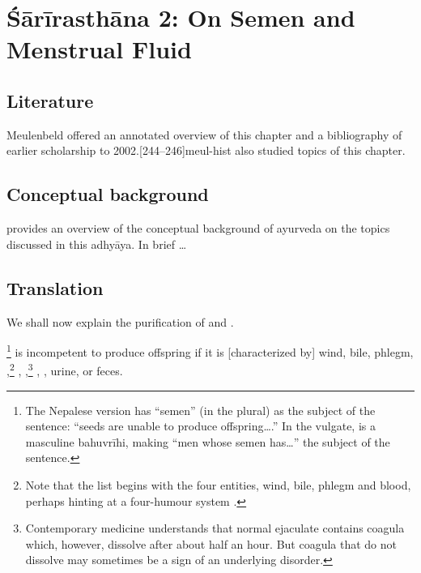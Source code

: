 
\chapter{Śārīrasthāna 2:  On Semen and Menstrual Fluid}


\section{Literature} 

Meulenbeld offered an annotated overview of this chapter and a bibliography
of earlier scholarship to 2002.[244--246]{meul-hist}  \citet[chs 
6--8]{das-2003} also studied topics of this chapter. 

\section{Conceptual background}


\citet[ch.\,13]{das-2003} provides an overview of the conceptual background of 
ayurveda on the topics discussed in this adhyāya.  In brief \ldots 

\section{Translation}

\begin{translation}
    
    \item [1] We shall now explain the purification of  and 
    .
    
    
    \item [3]  \footnote{The Nepalese version has
     “semen” (in the plural) as the subject of the sentence: “seeds 
    are
    unable to produce offspring\ldots.”  In the vulgate, 
    is a masculine bahuvrīhi, making “men whose semen has\ldots” the
    subject of the sentence.} is incompetent to produce offspring if it
    is [characterized by] wind, bile, phlegm,
    ,\footnote{Note that the list begins with the
        four entities, wind, bile, phlegm and blood, perhaps hinting at a
        four-humour system \citep[see][485--486]{wuja-2000}.}
        ,
        ,\footnote{Contemporary medicine understands
            that normal ejaculate contains coagula which, however, dissolve after
            about half an hour.  But coagula that do not dissolve may sometimes
            be a sign of an underlying disorder.} , , urine, or feces.
    
\end{translation}